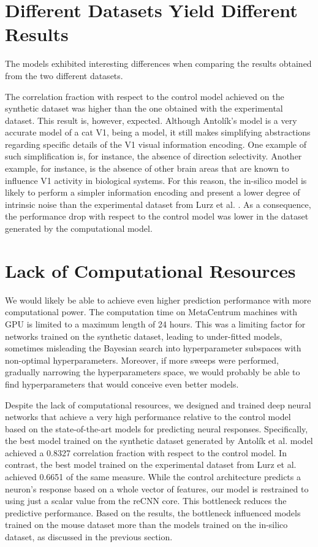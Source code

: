 \section{Different Datasets Yield Different Results}\label{diff_results}

The models exhibited interesting differences when comparing the results obtained from the two different datasets.

The correlation fraction with respect to the control model achieved on the synthetic dataset was higher than the one obtained with the experimental dataset. This result is, however, expected. Although Antolík's model \citep{antolik2019comprehensive} is a very accurate model of a cat V1, being a model, it still makes simplifying abstractions regarding specific details of the V1 visual information encoding. One example of such simplification is, for instance, the absence of direction selectivity. Another example, for instance, is the absence of other brain areas that are known to influence V1 activity in biological systems. For this reason, the in-silico model is likely to perform a simpler information encoding and present a lower degree of intrinsic noise than the experimental dataset from Lurz et al. \citep{lurz2021generalization}. As a consequence, the performance drop with respect to the control model was lower in the dataset generated by the computational model.


\section{Lack of Computational Resources}

We would likely be able to achieve even higher prediction performance with more computational power. The computation time on MetaCentrum machines with GPU is limited to a maximum length of 24 hours. This was a limiting factor for networks trained on the synthetic dataset, leading to under-fitted models, sometimes misleading the Bayesian search into hyperparameter subspaces with non-optimal hyperparameters. Moreover, if more sweeps were performed, gradually narrowing the hyperparameters space, we would probably be able to find hyperparameters that would conceive even better models. 

Despite the lack of computational resources, we designed and trained deep neural networks that achieve a very high performance relative to the control model based on the state-of-the-art models for predicting neural responses. Specifically, the best model trained on the synthetic dataset generated by Antolík et al. model \citep{antolik2019comprehensive} achieved a 0.8327 correlation fraction with respect to the control model. In contrast, the best model trained on the experimental dataset from Lurz et al. \citep{lurz2021generalization} achieved 0.6651 of the same measure. While the control architecture predicts a neuron's response based on a whole vector of features, our model is restrained to using just a scalar value from the reCNN core. This bottleneck reduces the predictive performance. Based on the results, the bottleneck influenced models trained on the mouse dataset more than the models trained on the in-silico dataset, as discussed in the previous section.

